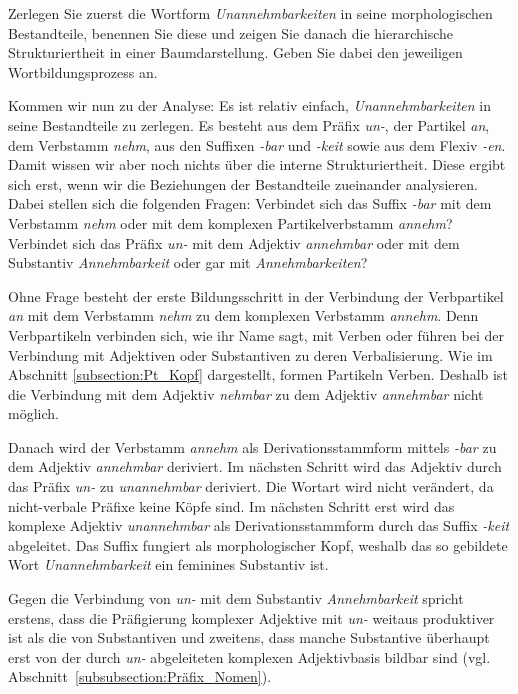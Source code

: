 Zerlegen Sie zuerst die Wortform \textit{Unannehmbarkeiten} in seine morphologischen Bestandteile, benennen Sie diese und zeigen Sie danach die hierarchische Strukturiertheit in einer Baumdarstellung. Geben Sie dabei den jeweiligen Wortbildungsprozess an.


Kommen wir nun zu der Analyse: Es ist relativ einfach, \textit{Unannehmbarkeiten} in seine Bestandteile zu zerlegen. Es besteht aus dem Präfix \textit{un-}, der Partikel \textit{an}, dem Verbstamm \textit{nehm}, aus den Suffixen \textit{-bar} und \textit{-keit} sowie aus dem Flexiv \textit{-en}. Damit wissen wir aber noch nichts über die interne Strukturiertheit. Diese ergibt sich erst, wenn wir die Beziehungen der Bestandteile zueinander analysieren. Dabei stellen sich \zB die folgenden Fragen: Verbindet sich das Suffix \textit{-bar} mit dem Verbstamm \textit{nehm} oder mit dem komplexen Partikelverbstamm \textit{annehm}? Verbindet sich das Präfix \textit{un-} mit dem Adjektiv \textit{annehmbar} oder mit dem Substantiv \textit{Annehmbarkeit} oder gar mit  \textit{Annehmbarkeiten}?

Ohne Frage besteht der erste Bildungsschritt in der Verbindung der Verbpartikel \textit{an} mit dem Verbstamm \textit{nehm} zu dem komplexen Verbstamm \textit{annehm}. Denn Verbpartikeln verbinden sich, wie ihr Name sagt, mit Verben oder führen bei der Verbindung mit Adjektiven oder Substantiven zu deren Verbalisierung. Wie im Abschnitt \ref{subsection:Pt_Kopf} dargestellt, formen Partikeln Verben. Deshalb ist die Verbindung mit dem Adjektiv \textit{nehmbar} zu dem Adjektiv \textit{annehmbar} nicht möglich. 

Danach wird der Verbstamm \textit{annehm} als Derivationsstammform mittels \textit{-bar} zu dem Adjektiv \textit{annehmbar} deriviert. Im nächsten Schritt wird das Adjektiv durch das Präfix \textit{un-} zu \textit{unannehmbar} deriviert. Die Wortart wird nicht verändert, da nicht-verbale Präfixe keine Köpfe sind. Im nächsten Schritt erst wird das komplexe Adjektiv \textit{unannehmbar} als Derivationsstammform durch das Suffix \textit{-keit} abgeleitet. Das Suffix fungiert als morphologischer Kopf, weshalb das so gebildete Wort \textit{Unannehmbarkeit} ein feminines Substantiv ist. 

Gegen die Verbindung von \textit{un-} mit dem Substantiv \textit{Annehmbarkeit} spricht erstens, dass die Präfigierung komplexer Adjektive mit \textit{un-} weitaus produktiver ist als die von Substantiven und zweitens, dass manche Substantive überhaupt erst von der durch \textit{un-} abgeleiteten komplexen Adjektivbasis bildbar sind (vgl. Abschnitt~\ref{subsubsection:Präfix_Nomen}). 

